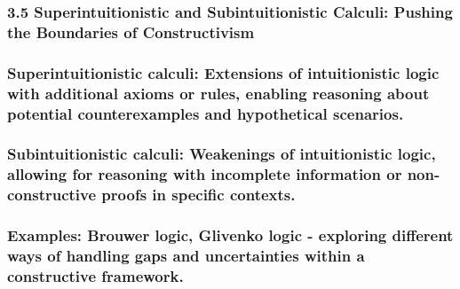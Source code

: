 \hypertarget{superintuitionistic-and-subintuitionistic-calculi-pushing-the-boundaries-of-constructivism}{%
\subsubsection*{\texorpdfstring{\textbf{3.5 Superintuitionistic and
Subintuitionistic Calculi: Pushing the Boundaries of
Constructivism}}{3.5 Superintuitionistic and Subintuitionistic Calculi: Pushing the Boundaries of Constructivism}}\label{superintuitionistic-and-subintuitionistic-calculi-pushing-the-boundaries-of-constructivism}}

\hypertarget{superintuitionistic-calculi-extensions-of-intuitionistic-logic-with-additional-axioms-or-rules-enabling-reasoning-about-potential-counterexamples-and-hypothetical-scenarios.}{%
\subsubsection{Superintuitionistic calculi: Extensions of intuitionistic
logic with additional axioms or rules, enabling reasoning about
potential counterexamples and hypothetical
scenarios.}\label{superintuitionistic-calculi-extensions-of-intuitionistic-logic-with-additional-axioms-or-rules-enabling-reasoning-about-potential-counterexamples-and-hypothetical-scenarios.}}

\hypertarget{subintuitionistic-calculi-weakenings-of-intuitionistic-logic-allowing-for-reasoning-with-incomplete-information-or-non-constructive-proofs-in-specific-contexts.}{%
\subsubsection{Subintuitionistic calculi: Weakenings of intuitionistic
logic, allowing for reasoning with incomplete information or
non-constructive proofs in specific
contexts.}\label{subintuitionistic-calculi-weakenings-of-intuitionistic-logic-allowing-for-reasoning-with-incomplete-information-or-non-constructive-proofs-in-specific-contexts.}}

\hypertarget{examples-brouwer-logic-glivenko-logic---exploring-different-ways-of-handling-gaps-and-uncertainties-within-a-constructive-framework.}{%
\subsubsection{Examples: Brouwer logic, Glivenko logic - exploring
different ways of handling gaps and uncertainties within a constructive
framework.}\label{examples-brouwer-logic-glivenko-logic---exploring-different-ways-of-handling-gaps-and-uncertainties-within-a-constructive-framework.}}


